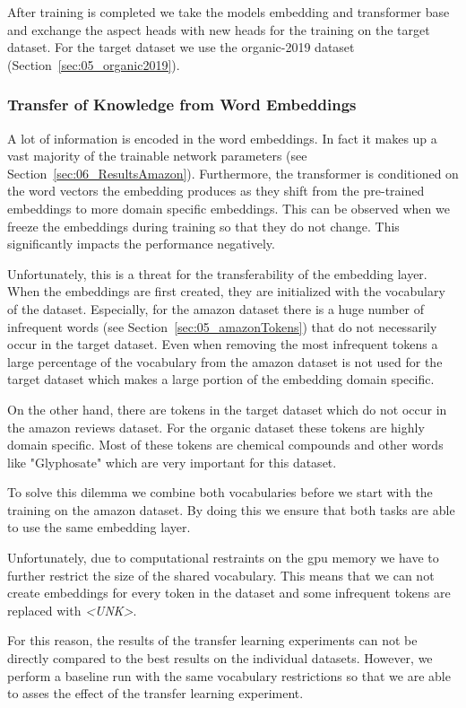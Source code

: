 After training is completed we take the models embedding and transformer base and exchange the aspect heads with new heads for the training on the target dataset. For the target dataset we use  the organic-2019 dataset {(Section~\ref{sec:05_organic2019})}.
\bigskip

\subsubsection*{Transfer of Knowledge from Word Embeddings}

A lot of information is encoded in the word embeddings. In fact it makes up a vast majority of the trainable network parameters {(see Section~\ref{sec:06_ResultsAmazon})}. Furthermore, the transformer is conditioned on the word vectors the embedding produces as they shift from the pre-trained embeddings to more domain specific embeddings. This can be observed when we freeze the embeddings during training so that they do not change. This significantly impacts the performance negatively.
\medskip

Unfortunately, this is a threat for the transferability of the embedding layer. When the embeddings are first created, they are initialized with the vocabulary of the dataset. Especially, for the amazon dataset there is a huge number of infrequent words {(see Section~\ref{sec:05_amazonTokens})} that do not necessarily occur in the target dataset. Even when removing the most infrequent tokens a large percentage of the vocabulary from the amazon dataset is not used for the target dataset which makes a large portion of the embedding domain specific. 
\medskip

On the other hand, there are tokens in the target dataset which do not occur in the amazon reviews dataset. For the organic dataset these tokens are highly domain specific. Most of these tokens are chemical compounds and other words like "Glyphosate" which are very important for this dataset.
\medskip

To solve this dilemma we combine both vocabularies before we start with the training on the amazon dataset. By doing this we ensure that both tasks are able to use the same embedding layer. 

Unfortunately, due to computational restraints on the \gls{gpu} memory we have to further restrict the size of the shared vocabulary. This means that we can not create embeddings for every token in the dataset and some infrequent tokens are replaced with \textit{<UNK>}.
\medskip

For this reason, the results of the transfer learning experiments can not be directly compared to the best results on the individual datasets. However, we perform a baseline run with the same vocabulary restrictions so that we are able to asses the effect of the transfer learning experiment.




